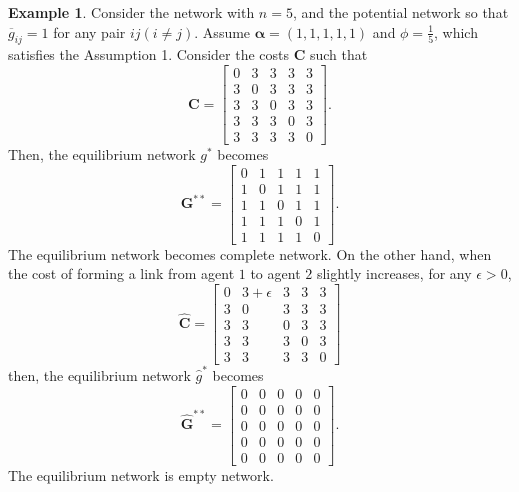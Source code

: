\documentclass[12pt]{article}
\theoremstyle{definition}
\newtheorem{example}{Example}
\newcommand{\bm}[1]{\boldsymbol{#1}}
\begin{document}
\begin{example}
Consider the network with $n = 5$, and the potential network so that $\overline{g}_{ij} = 1$ for any pair $ij(i \neq j)$.
Assume $\bm{\alpha} = (1, 1, 1, 1, 1)$ and $\phi = \frac{1}{5}$, which satisfies the Assumption 1.
Consider the costs $\bm{C}$ such that
\[ \bm{C} = \left[
			\begin{array}{ccccc}
				0 & 3 & 3 & 3 & 3 \\
				3 & 0 & 3 & 3 & 3 \\
				3 & 3 & 0 & 3 & 3 \\
				3 & 3 & 3 & 0 & 3  \\
				3 & 3 & 3 & 3 & 0
			\end{array} \right]. \]
Then, the equilibrium network $g^*$ becomes
\[\bm{G}^{**} = \left[
			\begin{array}{ccccc}
				0 & 1 & 1 & 1 & 1 \\
				1 & 0 & 1 & 1 & 1 \\
				1 & 1 & 0 & 1 & 1 \\
				1 & 1 & 1 & 0 & 1 \\
				1 & 1 & 1 & 1 & 0
			\end{array} \right]. \]
The equilibrium network becomes complete network.
On the other hand, when the cost of forming a link from agent $1$ to agent $2$ slightly increases, for any $\epsilon > 0$,
\[ \bm{\hat{C}} = \left[
			\begin{array}{ccccc}
				0 & 3 + \epsilon & 3 & 3 & 3 \\
				3 & 0 & 3 & 3 & 3 \\
				3 & 3 & 0 & 3 & 3 \\
				3 & 3 & 3 & 0 & 3  \\
				3 & 3 & 3 & 3 & 0
			\end{array} \right] \]
then, the equilibrium network $\hat{g}^*$ becomes
\[ \bm{\hat{G}}^{**} = \left[
			\begin{array}{ccccc}
				0 & 0 & 0 & 0 & 0 \\
				0 & 0 & 0 & 0 & 0 \\
				0 & 0 & 0 & 0 & 0 \\
				0 & 0 & 0 & 0 & 0 \\
				0 & 0 & 0 & 0 & 0
			\end{array} \right]. \]
The equilibrium network is empty network.
\end{example}
\end{document}
